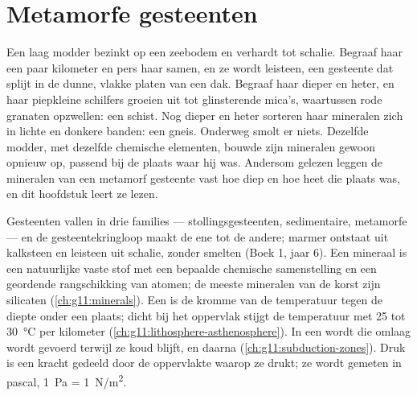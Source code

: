 \chapter{Metamorfe gesteenten}\label{ch:g12:metamorphic-rocks}

Een laag modder bezinkt op een zeebodem en verhardt tot schalie. Begraaf haar een paar
kilometer en pers haar samen, en ze wordt leisteen, een gesteente dat splijt in
de dunne, vlakke platen van een dak. Begraaf haar dieper en heter, en haar piepkleine
schilfers groeien uit tot glinsterende mica's, waartussen rode granaten opzwellen: een schist.
Nog dieper en heter sorteren haar mineralen zich in lichte en donkere
banden: een gneis. Onderweg smolt er niets. Dezelfde modder, met dezelfde
chemische elementen, bouwde zijn mineralen gewoon opnieuw op, passend bij de plaats waar hij
was. Andersom gelezen leggen de mineralen van een metamorf gesteente vast hoe diep
en hoe heet die plaats was, en dit hoofdstuk leert ze lezen.

\begin{recall}
Gesteenten vallen in drie families --- stollingsgesteenten, sedimentaire, metamorfe --- en
de gesteentekringloop maakt de ene tot de andere; marmer ontstaat uit kalksteen en
leisteen uit schalie, zonder smelten (Boek 1, jaar 6). Een mineraal is een natuurlijke
vaste stof met een bepaalde chemische samenstelling en een geordende rangschikking van
atomen; de meeste mineralen van de korst zijn silicaten
(\cref{ch:g11:minerals}). Een  is de kromme van de temperatuur tegen de
diepte onder een plaats; dicht bij het oppervlak stijgt de temperatuur met 25 tot
\qty{30}{\celsius} per kilometer (\cref{ch:g11:lithosphere-asthenosphere}).
In een  wordt  die omlaag wordt gevoerd terwijl ze koud blijft,
 en daarna  (\cref{ch:g11:subduction-zones}).
Druk is een kracht gedeeld door de oppervlakte waarop ze drukt; ze wordt gemeten in
pascal, \qty{1}{Pa} = \qty{1}{N/m^2}.
\end{recall}

